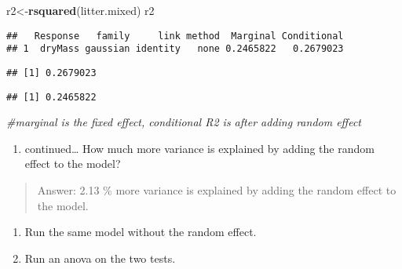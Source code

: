 \documentclass[]{article}
\newenvironment{Shaded}{\begin{snugshade}}{\end{snugshade}}
\newcommand{\CommentTok}[1]{\textcolor[rgb]{0.56,0.35,0.01}{\textit{#1}}}
\newcommand{\KeywordTok}[1]{\textcolor[rgb]{0.13,0.29,0.53}{\textbf{#1}}}
\newcommand{\NormalTok}[1]{#1}
\newcommand{\OperatorTok}[1]{\textcolor[rgb]{0.81,0.36,0.00}{\textbf{#1}}}
\providecommand{\tightlist}{%
  \setlength{\itemsep}{0pt}\setlength{\parskip}{0pt}}
\begin{document}
\begin{Shaded}
\begin{Highlighting}[]
\NormalTok{r2<-}\KeywordTok{rsquared}\NormalTok{(litter.mixed)}
\NormalTok{r2}
\end{Highlighting}
\end{Shaded}

\begin{verbatim}
##   Response   family     link method  Marginal Conditional
## 1  dryMass gaussian identity   none 0.2465822   0.2679023
\end{verbatim}

\begin{Shaded}
\end{Shaded}

\begin{verbatim}
## [1] 0.2679023
\end{verbatim}

\begin{Shaded}
\end{Shaded}

\begin{verbatim}
## [1] 0.2465822
\end{verbatim}

\begin{Shaded}
\begin{Highlighting}[]
\CommentTok{#marginal is the fixed effect, conditional R2 is after adding random effect}
\end{Highlighting}
\end{Shaded}

\begin{enumerate}
\def\labelenumi{\alph{enumi}.}
\setcounter{enumi}{1}
\tightlist
\item
  continued\ldots{} How much more variance is explained by adding the
  random effect to the model?
\end{enumerate}

\begin{quote}
Answer: 2.13 \% more variance is explained by adding the random effect
to the model.
\end{quote}

\begin{enumerate}
\def\labelenumi{\alph{enumi}.}
\setcounter{enumi}{2}
\tightlist
\item
  Run the same model without the random effect.
\item
  Run an anova on the two tests.
\end{enumerate}
\end{document}
